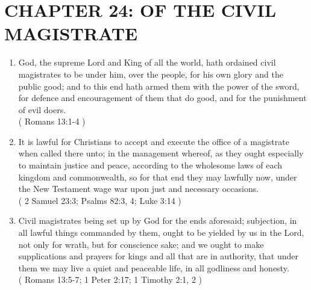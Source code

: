 \documentclass[12pt,a4paper]{book}
\begin{document}
\chapter{CHAPTER 24: OF THE CIVIL MAGISTRATE}
\label{ch-civ-maj}
\begin{enumerate}
\item God, the supreme Lord and King of all the world, hath ordained civil magistrates to be under him, over the people, for his own glory and the public good; and to this end hath armed them with the power of the sword, for defence and encouragement of them that do good, and for the punishment of evil doers.\\
( Romans 13:1-4 )
\item It is lawful for Christians to accept and execute the office of a magistrate when called there unto; in the management whereof, as they ought especially to maintain justice and peace, according to the wholesome laws of each kingdom and commonwealth, so for that end they may lawfully now, under the New Testament wage war upon just and necessary occasions.\\
( 2 Samuel 23:3; Psalms 82:3, 4; Luke 3:14 )
\item Civil magistrates being set up by God for the ends aforesaid; subjection, in all lawful things commanded by them, ought to be yielded by us in the Lord, not only for wrath, but for conscience sake; and we ought to make supplications and prayers for kings and all that are in authority, that under them we may live a quiet and peaceable life, in all godliness and honesty.\\
( Romans 13:5-7; 1 Peter 2:17; 1 Timothy 2:1, 2 )
\end{enumerate}
\end{document}
